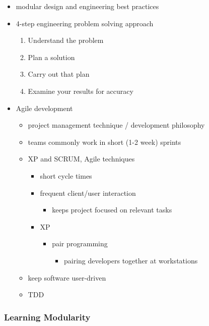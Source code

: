 \documentclass[11pt]{article}
\begin{document}
\begin{itemize}
\begin{itemize}
\item modular design and engineering best practices
\item 4-step engineering problem solving approach
\begin{enumerate}
\item Understand the problem
\item Plan a solution
\item Carry out that plan
\item Examine your results for accuracy
\end{enumerate}
\item Agile development
\begin{itemize}
\item project management technique / development philosophy
\item teams commonly work in short (1-2 week) sprints
\item XP and SCRUM, Agile techniques
\begin{itemize}
\item short cycle times
\item frequent client/user interaction
\begin{itemize}
\item keeps project focused on relevant tasks
\end{itemize}
\item XP
\begin{itemize}
\item pair programming
\begin{itemize}
\item pairing developers together at workstations
\end{itemize}
\end{itemize}
\end{itemize}
\item keep software user-driven
\item TDD
\end{itemize}
\end{itemize}
\end{itemize}

\subsubsection{Learning Modularity}
\label{sec-12-2-1}
\end{document}
